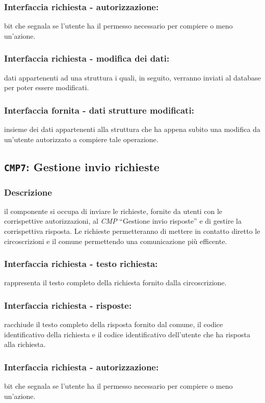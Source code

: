         \subsubsection{Interfaccia richiesta - autorizzazione:}
            bit che segnala se l'utente ha il permesso necessario per compiere o meno un'azione.
        \subsubsection{Interfaccia richiesta - modifica dei dati:}
            dati appartenenti ad una struttura i quali, in seguito, verranno inviati al database per poter essere modificati.
        \subsubsection{Interfaccia fornita - dati strutture modificati:}
            insieme dei dati appartenenti alla struttura che ha appena subito una modifica da un'utente autorizzato a compiere tale operazione.

    \subsection{\texttt{CMP7}: Gestione invio richieste}
        \subsubsection{Descrizione}
            il componente si occupa di inviare le richieste, fornite da utenti con le corrispettive autorizzazioni, al \textit{CMP} ``Gestione invio risposte'' e di gestire la corrispettiva risposta. Le richieste permetteranno di mettere in contatto diretto le circoscrizioni e il comune permettendo una comunicazione più efficente.
        \subsubsection{Interfaccia richiesta - testo richiesta:}
            rappresenta il testo completo della richiesta fornito dalla circoscrizione.
        \subsubsection{Interfaccia richiesta - risposte:}
            racchiude il testo completo della risposta fornito dal comune, il codice identificativo della richiesta e il codice identificativo dell'utente che ha risposta alla richiesta.
        \subsubsection{Interfaccia richiesta - autorizzazione:}
            bit che segnala se l'utente ha il permesso necessario per compiere o meno un'azione.
